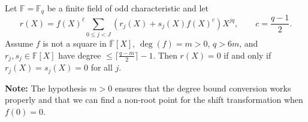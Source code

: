 \begin{lemma}\label{lem:stepanov-nonzero} \leanok {}
  Let $\mathbb{F} = \mathbb{F}_q$ be a finite field of odd characteristic and let
  \[
    r(X) = f(X)^\ell \sum_{0 \leq j < J} (r_j(X) + s_j(X) f(X)^c) X^{jq},
    \qquad c = \frac{q-1}{2}.
  \]
  Assume $f$ is not a square in $\overline{\mathbb{F}}[X]$, $\deg(f) = m > 0$, $q > 6m$, and $r_j, s_j \in \mathbb{F}[X]$ have degree $\leq \lceil\frac{q-m}{2}\rceil - 1$. Then $r(X) = 0$ if and only if $r_j(X) = s_j(X) = 0$ for all $j$.

  \textbf{Note:} The hypothesis $m > 0$ ensures that the degree bound conversion works properly and that we can find a non-root point for the shift transformation when $f(0) = 0$.
\end{lemma}
